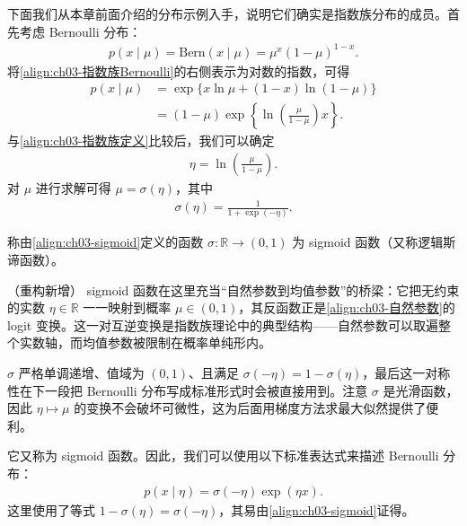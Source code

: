 \documentclass[../../main.tex]{subfiles}
\begin{document}
下面我们从本章前面介绍的分布示例入手，说明它们确实是指数族分布的成员。首先考虑 Bernoulli 分布：
\begin{align}
p(x\mid\mu)=\mathrm{Bern}(x\mid\mu)=\mu^{x}(1-\mu)^{1-x}.
\label{align:ch03-指数族Bernoulli}
\end{align}
将\eqref{align:ch03-指数族Bernoulli}的右侧表示为对数的指数，可得
\begin{align}
p(x\mid\mu)&=\exp\bigl\{x\ln\mu+(1-x)\ln(1-\mu)\bigr\}\nonumber\\
&=(1-\mu)\exp\left\{\ln\left(\frac{\mu}{1-\mu}\right)x\right\}.
\label{align:ch03-指数族Bernoulli重写}
\end{align}
与\eqref{align:ch03-指数族定义}比较后，我们可以确定
\begin{align}
\eta=\ln\left(\frac{\mu}{1-\mu}\right).
\label{align:ch03-自然参数}
\end{align}
对 $\mu$ 进行求解可得 $\mu=\sigma(\eta)$，其中
\begin{align}
\sigma(\eta)=\frac{1}{1+\exp(-\eta)}.
\label{align:ch03-sigmoid}
\end{align}

\begin{definition}[sigmoid 函数]\label{definition:ch03-sigmoid}
称由\eqref{align:ch03-sigmoid}定义的函数 $\sigma:\mathbb{R}\to(0,1)$ 为 sigmoid 函数（又称逻辑斯谛函数）。
\end{definition}

\begin{remark}（重构新增）
sigmoid 函数在这里充当“自然参数到均值参数”的桥梁：它把无约束的实数 $\eta\in\mathbb{R}$ 一一映射到概率 $\mu\in(0,1)$，其反函数正是\eqref{align:ch03-自然参数}的 logit 变换。这一对互逆变换是指数族理论中的典型结构——自然参数可以取遍整个实数轴，而均值参数被限制在概率单纯形内。

$\sigma$ 严格单调递增、值域为 $(0,1)$、且满足 $\sigma(-\eta)=1-\sigma(\eta)$，最后这一对称性在下一段把 Bernoulli 分布写成标准形式时会被直接用到。注意 $\sigma$ 是光滑函数，因此 $\eta\mapsto\mu$ 的变换不会破坏可微性，这为后面用梯度方法求最大似然提供了便利。
\end{remark}

它又称为 sigmoid 函数。因此，我们可以使用以下标准表达式来描述 Bernoulli 分布：
\begin{align}
p(x\mid\eta)=\sigma(-\eta)\exp(\eta x).
\label{align:ch03-Bernoulli指数族}
\end{align}
这里使用了等式 $1-\sigma(\eta)=\sigma(-\eta)$，其易由\eqref{align:ch03-sigmoid}证得。
\end{document}
